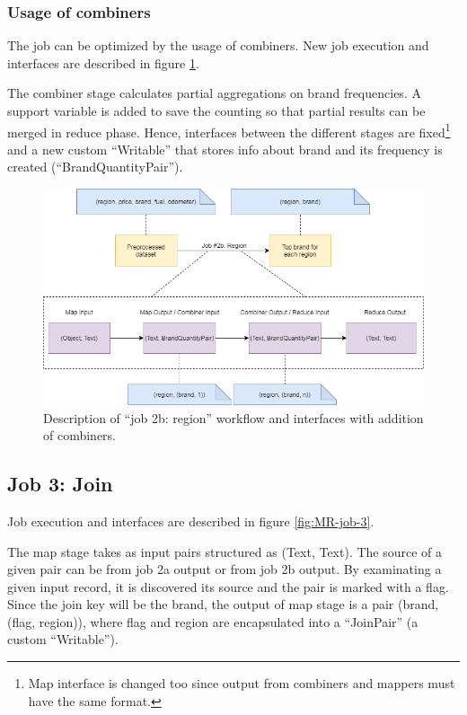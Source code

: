 \subsubsection{Usage of combiners}

The job can be optimized by the usage of combiners. New job execution and interfaces are described in figure \ref{fig:MR-job-2b-combiner}.

The combiner stage calculates partial aggregations on brand frequencies. A support variable is added to save the counting so that partial results can be merged in reduce phase. Hence, interfaces between the different stages are fixed\footnote{Map interface is changed too since output from combiners and mappers must have the same format.} and a new custom ``Writable'' that stores info about brand and its frequency is created (``BrandQuantityPair'').

\begin{figure}[H]
	\centering
	\includegraphics[scale=0.6]{images/2-mapreduce/MR-job-2b-combiner.png}
	\caption{Description of ``job 2b: region'' workflow and interfaces with addition of combiners.}
	\label{fig:MR-job-2b-combiner}
\end{figure} 

\subsection{Job 3: Join}

Job execution and interfaces are described in figure \ref{fig:MR-job-3}.

The map stage takes as input pairs structured as (Text, Text). The source of a given pair can be from job 2a output or from job 2b output. By examinating a given input record, it is discovered its source and the pair is marked with a flag.
Since the join key will be the brand, the output of map stage is a pair (brand, (flag, region)), where flag and region are encapsulated into a ``JoinPair'' (a custom ``Writable'').

